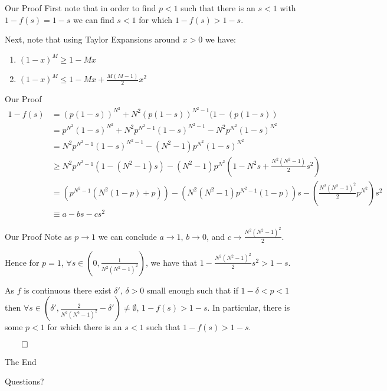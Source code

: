 \documentclass{beamer}
\begin{document}
\begin{frame}{Our Proof}
First note that in order to find $p < 1$ such that there is an $s < 1$ with $1 - f(s) = 1 - s$ we can find $s < 1$ for which $1 - f(s) > 1 - s$.

\vspace{10 mm}
\pause
Next, note that using Taylor Expansions around $x > 0$ we have:
\begin{enumerate}
\item $(1 - x)^M \ge 1 - Mx$
\item $(1 - x)^M \le 1 - Mx + \frac{M(M - 1)}{2}x^2$
\end{enumerate}
\end{frame}

\begin{frame}{Our Proof}
\tiny
\begin{align*}
1 - f(s) &= (p(1 - s))^{N^2} + N^2(p(1 - s))^{N^2 - 1}(1 - (p(1 - s)) \\
&= p^{N^2}(1 - s)^{N^2} + N^2p^{N^2 - 1}(1 - s)^{N^2 - 1} - N^2p^{N^2}(1 - s)^{N^2} \\
&= N^2p^{N^2 - 1}(1 - s)^{N^2 - 1} - (N^2 - 1)p^{N^2}(1 - s)^{N^2} \\
&\ge N^2p^{N^2 - 1}(1 - (N^2 - 1)s) - (N^2 - 1)p^{N^2} (1 - N^2s + \frac{N^2(N^2 - 1)}{2}s^2) \\
&= (p^{N^2 - 1}(N^2(1 - p) + p)) - (N^2(N^2 - 1)p^{N^2 - 1}(1 - p))s - (\frac{N^2(N^2 - 1)^2}{2}p^{N^2})s^2 \\
&\equiv a - bs - cs^2
\end{align*}
\normalsize
\end{frame}

\begin{frame}{Our Proof}
Note as $p \to 1$ we can conclude $a \to 1$, $b \to 0$, and $c \to \frac{N^2(N^2 - 1)^2}{2}$.

\pause
\vspace{10 mm}
Hence for $p = 1$, $ \forall s \in (0, \frac{1}{N^2(N^2 - 1)^2})$, we have that $1 - \frac{N^2(N^2 - 1)^2}{2}s^2 > 1 - s$.

\pause
\vspace{10 mm}
As $f$ is continuous there exist $\delta '$, $\delta > 0$ small enough such that if $1 - \delta < p < 1$ then $\forall s \in (\delta ', \frac{2}{N^2(N^2 - 1)^2} - \delta ') \ne \emptyset$, $1 - f(s) > 1 - s$. In particular, there is some $p < 1$ for which there is an $s < 1$ such that $1 - f(s) > 1 - s$.

\hspace{100 mm} $\qed$
\end{frame}

\begin{frame}{The End}
\huge
\centerline{Questions?}
\end{frame}

\end{document}
